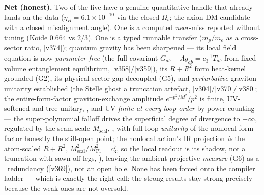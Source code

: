 \documentclass[11pt,a4paper]{article}
\newcommand{\cthree}{c_3}
\newcommand{\Mpl}{M_{\mathrm{Pl}}}
\begin{document}
\noindent\textbf{Net (honest).} Two of the five have a genuine quantitative handle that already lands on
the data ($\eta_B=6.1\times10^{-10}$ via the closed $\Omega_b$; the axion DM candidate with a closed
misalignment angle). One is a computed \emph{near}-miss reported without tuning (Koide $0.664$ vs $2/3$).
One is a typed runnable transfer ($m_p/m_e$ as a cross-sector ratio, \vref{v374}); quantum gravity has been
sharpened --- its local field equation is now \emph{parameter-free} (the full covariant
$G_{ab}{+}\Lambda g_{ab}{=}\cthree^{-1}T_{ab}$ from fixed-volume entanglement equilibrium, \vref{v358}/\vref{v359}),
its $R+R^2$ form heat-kernel grounded (G2), its physical sector gap-decoupled
(G5), and \emph{perturbative} graviton unitarity established (the Stelle ghost a truncation artefact,
\vref{v304}/\vref{v370}/\vref{v380}; the entire-form-factor graviton-exchange amplitude $e^{-p^2/M^2}/p^2$ is
finite, UV-softened and tree-unitary, , and UV-\emph{finite at every loop order} by
power counting --- the super-polynomial falloff drives the superficial degree of divergence to $-\infty$, regulated
by the seam scale $M_{\mathrm{scal}}$, , with full loop \emph{unitarity} of the
nonlocal form factor honestly the still-open point; the nonlocal action's IR projection \emph{is} the atom-scaled
$R+R^2$, $M_{\mathrm{scal}}^2/\Mpl^2=\cthree^7$, so the local readout is its shadow, not a truncation with sawn-off legs,
), leaving the ambient projective \emph{measure} (G6) as a \mC\ redundancy
(\vref{v369}), not an open hole. None has been
forced onto the compiler ladder --- which is exactly the right call: the strong results stay strong
precisely because the weak ones are not oversold.
\end{document}

